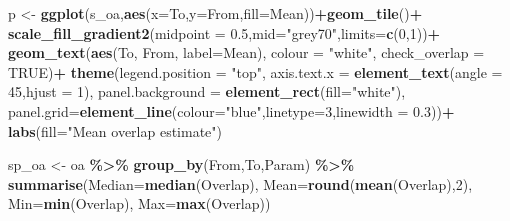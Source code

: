 \documentclass[10pt,letterpaper]{article}
\newenvironment{Shaded}{\begin{snugshade}}{\end{snugshade}}
\newcommand{\AttributeTok}[1]{\textcolor[rgb]{0.13,0.29,0.53}{#1}}
\newcommand{\ConstantTok}[1]{\textcolor[rgb]{0.56,0.35,0.01}{#1}}
\newcommand{\DecValTok}[1]{\textcolor[rgb]{0.00,0.00,0.81}{#1}}
\newcommand{\FloatTok}[1]{\textcolor[rgb]{0.00,0.00,0.81}{#1}}
\newcommand{\FunctionTok}[1]{\textcolor[rgb]{0.13,0.29,0.53}{\textbf{#1}}}
\newcommand{\NormalTok}[1]{#1}
\newcommand{\OtherTok}[1]{\textcolor[rgb]{0.56,0.35,0.01}{#1}}
\newcommand{\SpecialCharTok}[1]{\textcolor[rgb]{0.81,0.36,0.00}{\textbf{#1}}}
\newcommand{\StringTok}[1]{\textcolor[rgb]{0.31,0.60,0.02}{#1}}
\begin{document}
\begin{Shaded}
\begin{Highlighting}[]
\NormalTok{p }\OtherTok{\textless{}{-}} \FunctionTok{ggplot}\NormalTok{(s\_oa,}\FunctionTok{aes}\NormalTok{(}\AttributeTok{x=}\NormalTok{To,}\AttributeTok{y=}\NormalTok{From,}\AttributeTok{fill=}\NormalTok{Mean))}\SpecialCharTok{+}\FunctionTok{geom\_tile}\NormalTok{()}\SpecialCharTok{+}
  \FunctionTok{scale\_fill\_gradient2}\NormalTok{(}\AttributeTok{midpoint =} \FloatTok{0.5}\NormalTok{,}\AttributeTok{mid=}\StringTok{"grey70"}\NormalTok{,}\AttributeTok{limits=}\FunctionTok{c}\NormalTok{(}\DecValTok{0}\NormalTok{,}\DecValTok{1}\NormalTok{))}\SpecialCharTok{+}
  \FunctionTok{geom\_text}\NormalTok{(}\FunctionTok{aes}\NormalTok{(To, From, }\AttributeTok{label=}\NormalTok{Mean), }\AttributeTok{colour =} \StringTok{"white"}\NormalTok{, }\AttributeTok{check\_overlap =} \ConstantTok{TRUE}\NormalTok{)}\SpecialCharTok{+}
  \FunctionTok{theme}\NormalTok{(}\AttributeTok{legend.position =} \StringTok{"top"}\NormalTok{,}
        \AttributeTok{axis.text.x =} \FunctionTok{element\_text}\NormalTok{(}\AttributeTok{angle =} \DecValTok{45}\NormalTok{,}\AttributeTok{hjust =} \DecValTok{1}\NormalTok{),}
        \AttributeTok{panel.background =} \FunctionTok{element\_rect}\NormalTok{(}\AttributeTok{fill=}\StringTok{"white"}\NormalTok{),}
        \AttributeTok{panel.grid=}\FunctionTok{element\_line}\NormalTok{(}\AttributeTok{colour=}\StringTok{"blue"}\NormalTok{,}\AttributeTok{linetype=}\DecValTok{3}\NormalTok{,}\AttributeTok{linewidth =} \FloatTok{0.3}\NormalTok{))}\SpecialCharTok{+}
  \FunctionTok{labs}\NormalTok{(}\AttributeTok{fill=}\StringTok{"Mean overlap estimate"}\NormalTok{)}


\NormalTok{sp\_oa }\OtherTok{\textless{}{-}}\NormalTok{ oa }\SpecialCharTok{\%\textgreater{}\%}
  \FunctionTok{group\_by}\NormalTok{(From,To,Param) }\SpecialCharTok{\%\textgreater{}\%}
  \FunctionTok{summarise}\NormalTok{(}\AttributeTok{Median=}\FunctionTok{median}\NormalTok{(Overlap),}
            \AttributeTok{Mean=}\FunctionTok{round}\NormalTok{(}\FunctionTok{mean}\NormalTok{(Overlap),}\DecValTok{2}\NormalTok{),}
            \AttributeTok{Min=}\FunctionTok{min}\NormalTok{(Overlap),}
            \AttributeTok{Max=}\FunctionTok{max}\NormalTok{(Overlap))}


\end{Highlighting}
\end{Shaded}
\end{document}
